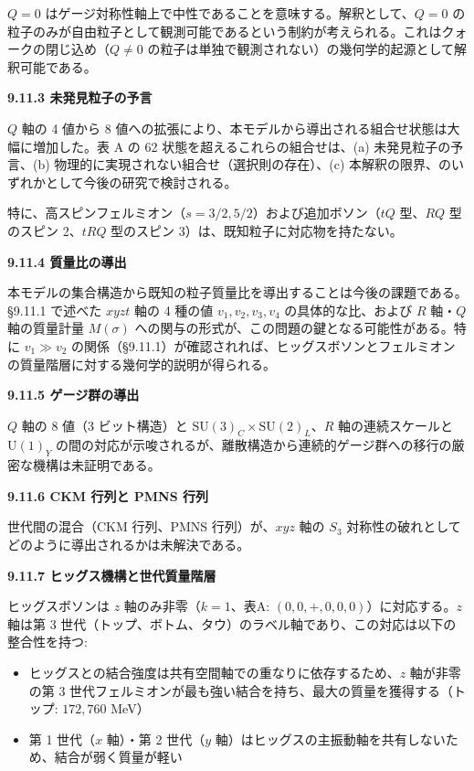 \documentclass[
  a4paper,11pt]{ltjsarticle}
\providecommand{\tightlist}{%
  \setlength{\itemsep}{0pt}\setlength{\parskip}{0pt}}
\theoremstyle{definition}
\theoremstyle{remark}
\begin{document}
\(Q = 0\)
はゲージ対称性軸上で中性であることを意味する。解釈として、\(Q = 0\)
の粒子のみが自由粒子として観測可能であるという制約が考えられる。これはクォークの閉じ込め（\(Q \neq 0\)
の粒子は単独で観測されない）の幾何学的起源として解釈可能である。

\textbf{9.11.3 未発見粒子の予言}

\(Q\) 軸の 4 値から 8
値への拡張により、本モデルから導出される組合せ状態は大幅に増加した。表 A
の 62 状態を超えるこれらの組合せは、(a) 未発見粒子の予言、(b)
物理的に実現されない組合せ（選択則の存在）、(c)
本解釈の限界、のいずれかとして今後の研究で検討される。

特に、高スピンフェルミオン（\(s = 3/2, 5/2\)）および追加ボソン（\(tQ\)
型、\(RQ\) 型のスピン 2、\(tRQ\) 型のスピン
3）は、既知粒子に対応物を持たない。

\textbf{9.11.4 質量比の導出}

本モデルの集合構造から既知の粒子質量比を導出することは今後の課題である。§9.11.1
で述べた \(xyzt\) 軸の 4 種の値 \(v_1, v_2, v_3, v_4\)
の具体的な比、および \(R\) 軸・\(Q\) 軸の質量計量 \(M(\sigma)\)
への関与の形式が、この問題の鍵となる可能性がある。特に \(v_1 \gg v_2\)
の関係（§9.11.1）が確認されれば、ヒッグスボソンとフェルミオンの質量階層に対する幾何学的説明が得られる。

\textbf{9.11.5 ゲージ群の導出}

\(Q\) 軸の 8 値（3 ビット構造）と
\(\mathrm{SU}(3)_C \times \mathrm{SU}(2)_L\)、\(R\) 軸の連続スケールと
\(\mathrm{U}(1)_Y\)
の間の対応が示唆されるが、離散構造から連続的ゲージ群への移行の厳密な機構は未証明である。

\textbf{9.11.6 CKM 行列と PMNS 行列}

世代間の混合（CKM 行列、PMNS 行列）が、\(xyz\) 軸の \(S_3\)
対称性の破れとしてどのように導出されるかは未解決である。

\textbf{9.11.7 ヒッグス機構と世代質量階層}

ヒッグスボソンは \(z\) 軸のみ非零（\(k = 1\)、表A:
\((0, 0, +, 0, 0, 0)\)）に対応する。\(z\) 軸は第 3
世代（トップ、ボトム、タウ）のラベル軸であり、この対応は以下の整合性を持つ:

\begin{itemize}
\tightlist
\item
  ヒッグスとの結合強度は共有空間軸での重なりに依存するため、\(z\)
  軸が非零の第 3
  世代フェルミオンが最も強い結合を持ち、最大の質量を獲得する（トップ:
  \(172{,}760\) MeV）
\item
  第 1 世代（\(x\) 軸）・第 2 世代（\(y\)
  軸）はヒッグスの主振動軸を共有しないため、結合が弱く質量が軽い
\end{itemize}
\end{document}
